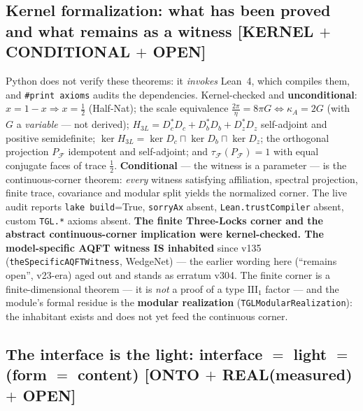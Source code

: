\documentclass[11pt]{article}
\theoremstyle{definition}\newtheorem{deriv}{Derivation}
\begin{document}
\subsection*{Kernel formalization: what has been proved and what remains as a witness \textsf{[KERNEL $+$ CONDITIONAL $+$ OPEN]}}

Python does not verify these theorems: it \emph{invokes} Lean~4, which compiles them, and \texttt{\#print axioms} audits the dependencies. Kernel-checked and \textbf{unconditional}: $x=1-x\Rightarrow x=\tfrac12$ (Half-Nat); the scale equivalence $\tfrac{2\pi}{\eta}=8\pi G\iff\kappa_A=2G$ (with $G$ a \emph{variable} --- not derived); $H_{3L}=D_c^{*}D_c+D_b^{*}D_b+D_z^{*}D_z$ self-adjoint and positive semidefinite; $\ker H_{3L}=\ker D_c\sqcap\ker D_b\sqcap\ker D_z$; the orthogonal projection $P_{\mathcal F}$ idempotent and self-adjoint; and $\tau_{\mathcal F}(P_{\mathcal F})=1$ with equal conjugate faces of trace $\tfrac12$. \textbf{Conditional} --- the witness is a parameter --- is the continuous-corner theorem: \emph{every} witness satisfying affiliation, spectral projection, finite trace, covariance and modular split yields the normalized corner. The live audit reports \texttt{lake build}=True, \texttt{sorryAx} absent, \texttt{Lean.trustCompiler} absent, custom \texttt{TGL.*} axioms absent. \textbf{The finite Three-Locks corner and the abstract continuous-corner implication were kernel-checked. The model-specific AQFT witness IS inhabited} since v135 (\texttt{theSpecificAQFTWitness}, WedgeNet) --- the earlier wording here (``remains open'', v23-era) aged out and stands as erratum v304. The finite corner is a finite-dimensional theorem --- it is \emph{not} a proof of a type $\mathrm{III}_1$ factor --- and the module's formal residue is the \textbf{modular realization} (\texttt{TGLModularRealization}): the inhabitant exists and does not yet feed the continuous corner.

\subsection*{The interface is the light: interface $=$ light $=$ (form $=$ content) \textsf{[ONTO $+$ REAL(measured) $+$ OPEN]}}
\end{document}
